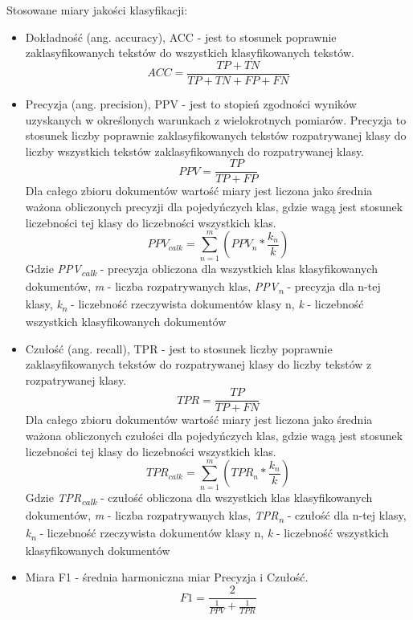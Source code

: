 \documentclass{classrep}
\begin{document}
\ \\ \\ 
Stosowane miary jakości klasyfikacji:\\
\begin{itemize}
  \item Dokładność (ang. accuracy), ACC  - jest to stosunek poprawnie zaklasyfikowanych tekstów do wszystkich klasyfikowanych tekstów.
 \begin{equation}ACC = \frac{TP + TN}{TP + TN + FP + FN} \end{equation}
 \item Precyzja (ang. precision), PPV  - jest to stopień zgodności wyników uzyskanych w określonych warunkach z wielokrotnych pomiarów. Precyzja to stosunek liczby poprawnie zaklasyfikowanych tekstów rozpatrywanej klasy do liczby wszystkich tekstów zaklasyfikowanych do rozpatrywanej klasy. 
\begin{equation} PPV =  \frac{TP} {TP+FP} \end{equation} 
Dla całego zbioru dokumentów wartość miary jest liczona jako średnia ważona obliczonych precyzji dla pojedyńczych klas, gdzie wagą jest stosunek liczebności tej klasy do liczebności wszystkich klas. 
\begin{equation} PPV_{calk} = \sum_{n=1}^{m} (PPV_n *\frac{k_n}{k}) \end{equation}
Gdzie \textit{PPV\textsubscript{calk}} - precyzja obliczona dla wszystkich klas klasyfikowanych dokumentów,  \textit{m} - liczba rozpatrywanych klas, \textit{PPV\textsubscript{n}} - precyzja dla n-tej klasy, \textit{k\textsubscript{n}} - liczebność rzeczywista dokumentów klasy n, \textit{k} - liczebność wszystkich klasyfikowanych dokumentów\\
\item Czułość (ang. recall), TPR  - jest to stosunek liczby poprawnie zaklasyfikowanych tekstów do rozpatrywanej klasy do liczby tekstów z rozpatrywanej klasy. 
 \begin{equation}   TPR = \frac{TP}{TP + FN} \end{equation}
Dla całego zbioru dokumentów wartość miary jest liczona jako średnia ważona obliczonych czułości dla pojedyńczych klas, gdzie wagą jest stosunek liczebności tej klasy do liczebności wszystkich klas. 
\begin{equation} TPR_{calk} = \sum_{n=1}^{m} (TPR_n *\frac{k_n}{k}) \end{equation}
Gdzie \textit{TPR\textsubscript{calk}} - czułość obliczona dla wszystkich klas klasyfikowanych dokumentów,  \textit{m} - liczba rozpatrywanych klas, \textit{TPR\textsubscript{n}} - czułość dla n-tej klasy,  \textit{k\textsubscript{n}} - liczebność rzeczywista dokumentów klasy n, \textit{k} - liczebność wszystkich klasyfikowanych dokumentów\\
\item Miara F1 - średnia harmoniczna miar Precyzja i Czułość. 
\begin{equation}   F1 = \frac{2}{\frac{1}{PPV} + \frac{1}{TPR}} \end{equation}
\end{itemize}
\end{document}
